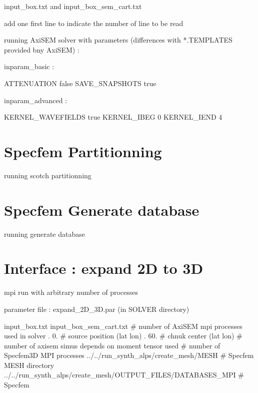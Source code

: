 \documentclass[a4paper,11pt]{article}
\begin{document}
input\_box.txt and input\_box\_sem\_cart.txt  \newline

add one first line to indicate the number of line to be read \newline

running AxiSEM solver with parameters (differences with *.TEMPLATES provided
bny AxiSEM) : \newline

inparam\_basic : \newline

ATTENUATION         false \newline
SAVE\_SNAPSHOTS     true \newline

inparam\_advanced : \newline

KERNEL\_WAVEFIELDS   true \newline
KERNEL\_IBEG         0 \newline
KERNEL\_IEND         4 \newline


\section{Specfem Partitionning}

running scotch partitionning

\section{Specfem Generate database}

running generate database

\section{Interface : expand 2D to 3D}

mpi run with arbitrary number of processes  \newline

parameter file : expand\_2D\_3D.par (in SOLVER directory)\newline

input\_box.txt \newline
input\_box\_sem\_cart.txt                           \# number of AxiSEM mpi processes used in solver  . 0.                     \# source position (lat lon)  .  60.                    \# chnuk center (lat lon)                              \# number of axisem simus depends on moment tensor
used                            \# number of Specfem3D MPI processes   \newline
../../run\_synth\_alps/create\_mesh/MESH \# Specfem MESH directory  \newline
../../run\_synth\_alps/create\_mesh/OUTPUT\_FILES/DATABASES\_MPI \# Specfem
\end{document}

